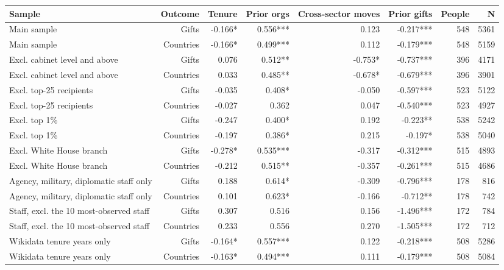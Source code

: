 \begin{tabular}{lrrrrrrr}
\toprule
Sample & Outcome & Tenure & Prior orgs & Cross-sector moves & Prior gifts & People & N \\
\midrule
Main sample & Gifts & -0.166* & 0.556*** & 0.123 & -0.217*** & 548 & 5361 \\
Main sample & Countries & -0.166* & 0.499*** & 0.112 & -0.179*** & 548 & 5159 \\
Excl. cabinet level and above & Gifts & 0.076 & 0.512** & -0.753* & -0.737*** & 396 & 4171 \\
Excl. cabinet level and above & Countries & 0.033 & 0.485** & -0.678* & -0.679*** & 396 & 3901 \\
Excl. top-25 recipients & Gifts & -0.035 & 0.408* & -0.050 & -0.597*** & 523 & 5122 \\
Excl. top-25 recipients & Countries & -0.027 & 0.362 & 0.047 & -0.540*** & 523 & 4927 \\
Excl. top 1\% & Gifts & -0.247 & 0.400* & 0.192 & -0.223** & 538 & 5242 \\
Excl. top 1\% & Countries & -0.197 & 0.386* & 0.215 & -0.197* & 538 & 5040 \\
Excl. White House branch & Gifts & -0.278* & 0.535*** & -0.317 & -0.312*** & 515 & 4893 \\
Excl. White House branch & Countries & -0.212 & 0.515** & -0.357 & -0.261*** & 515 & 4686 \\
Agency, military, diplomatic staff only & Gifts & 0.188 & 0.614* & -0.309 & -0.796*** & 178 & 816 \\
Agency, military, diplomatic staff only & Countries & 0.101 & 0.623* & -0.166 & -0.712** & 178 & 742 \\
Staff, excl. the 10 most-observed staff & Gifts & 0.307 & 0.516 & 0.156 & -1.496*** & 172 & 784 \\
Staff, excl. the 10 most-observed staff & Countries & 0.233 & 0.556 & 0.270 & -1.505*** & 172 & 712 \\
Wikidata tenure years only & Gifts & -0.164* & 0.557*** & 0.122 & -0.218*** & 508 & 5286 \\
Wikidata tenure years only & Countries & -0.163* & 0.494*** & 0.111 & -0.179*** & 508 & 5084 \\
\bottomrule
\end{tabular}
\par{}

